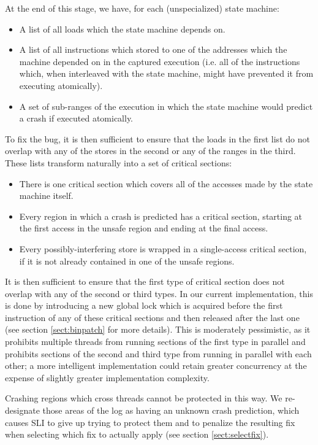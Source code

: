 \documentclass[10pt,twocolumn,preprint,natbib,authoryear]{sigplanconf}
\begin{document}
At the end of this stage, we have, for each (unspecialized) state machine:

\begin{itemize}
\item A list of all loads which the state machine depends on.
\item A list of all instructions which stored to one of the addresses
  which the machine depended on in the captured execution (i.e. all of
  the instructions which, when interleaved with the state machine,
  might have prevented it from executing atomically).
\item A set of sub-ranges of the execution in which the state machine
  would predict a crash if executed atomically.
\end{itemize}

To fix the bug, it is then sufficient to ensure that the loads in the
first list do not overlap with any of the stores in the second or any
of the ranges in the third.  These lists transform naturally into a
set of critical sections:

\begin{itemize}
\item There is one critical section which covers all of the accesses
  made by the state machine itself.
\item Every region in which a crash is predicted has a critical
  section, starting at the first access in the unsafe region and
  ending at the final access.
\item Every possibly-interfering store is wrapped in a single-access
  critical section, if it is not already contained in one of the
  unsafe regions.
\end{itemize}

It is then sufficient to ensure that the first type of critical
section does not overlap with any of the second or third types.  In
our current implementation, this is done by introducing a new global
lock which is acquired before the first instruction of any of these
critical sections and then released after the last one (see section
\ref{sect:binpatch} for more details).  This is moderately
pessimistic, as it prohibits multiple threads from running sections of
the first type in parallel and prohibits sections of the second and
third type from running in parallel with each other; a more
intelligent implementation could retain greater concurrency at the
expense of slightly greater implementation complexity.

Crashing regions which cross threads cannot be protected in this way.
We re-designate those areas of the log as having an unknown crash
prediction, which causes SLI to give up trying to protect them and to
penalize the resulting fix when selecting which fix to actually apply
(see section \ref{sect:selectfix}).
\end{document}
